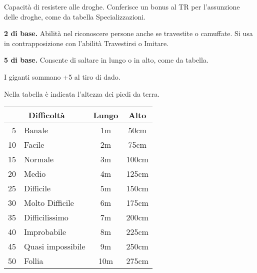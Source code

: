 
Capacit\`a di resistere alle droghe. Conferisce un bonus al TR per
l'assunzione delle droghe, come da tabella Specializzazioni.

\iffullversion
{} \textbf{2 di base.}  Abilit\`a nel
riconoscere persone anche se travestite o camuffate. Si usa in
contrapposizione con l'abilit\`a Travestirsi o Imitare.
\fi

 \textbf{5 di base.} Consente di saltare in lungo
o in alto, come da tabella.  

I giganti sommano +5 al tiro di dado.

Nella tabella \`e indicata l'altezza dei piedi da terra.

\noindent
\begin{center}
\begin{tabular}{|rl|c|c|}
\hline
\multicolumn{2}{|c|}{Difficolt\`a} & Lungo& Alto \\ \hline
5  &Banale& 1m& 50cm \\ \hline
10 & Facile& 2m& 75cm\\ \hline
15 & Normale& 3m& 100cm \\ \hline
20 & Medio& 4m& 125cm\\ \hline
25 & Difficile& 5m& 150cm\\ \hline
30 & Molto Difficile& 6m& 175cm \\ \hline
35 & Difficilissimo& 7m& 200cm \\ \hline
40 & Improbabile& 8m& 225cm\\ \hline
45 & Quasi impossibile& 9m& 250cm \\ \hline
50 & Follia& 10m& 275cm \\ \hline
\end{tabular}
\end{center}


